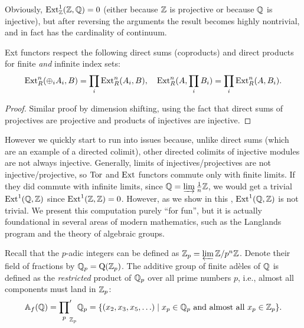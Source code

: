 Obviously, $\operatorname{Ext}^1_{\mathbb{Z}}(\mathbb{Z},\mathbb{Q})=0$ (either because $\mathbb{Z}$ is projective or because $\mathbb{Q}$ is injective), but after reversing the arguments the result becomes highly nontrivial, and in fact has the cardinality of continuum.

\begin{thm} Ext functors respect the following direct sums (coproducts) and direct products for finite \emph{and} infinite index sets:
    \[\operatorname{Ext}_R^n(\oplus_i A_i,B)=\prod_i\operatorname{Ext}_R^n(A_i,B),\quad \operatorname{Ext}_R^n(A,\prod_i B_i)=\prod_i \operatorname{Ext}_R^n(A,B_i).\]
\end{thm}
\begin{proof}
    Similar proof by dimension shifting, using the fact that direct sums of projectives are projective and products of injectives are injective.
\end{proof}

However we quickly start to run into issues because, unlike direct sums (which are an example of a directed colimit), other directed colimits of injective modules are not always injective. Generally, limits of injectives/projectives are not injective/projective, so $\operatorname{Tor}$ and $\operatorname{Ext}$ functors commute only with finite  limits. If they did commute with infinite limits, since $\mathbb{Q}=\varinjlim \frac{1}{n}\mathbb{Z}$, we would get a trivial $\operatorname{Ext}^1(\mathbb{Q},\mathbb{Z})$ since $\operatorname{Ext}^1(\mathbb{Z},\mathbb{Z})=0$. However, as we show in this \sect, $\operatorname{Ext}^1(\mathbb{Q},\mathbb{Z})$ is not trivial. We present this computation purely ``for fun'', but it is actually foundational in several areas of modern mathematics, such as the Langlands program and the theory of algebraic groups.

\begin{defn}
    Recall that the $p$-adic integers can be defined as $\mathbb{Z}_p=\varprojlim \mathbb{Z}\slash p^n\mathbb{Z}$. Denote their field of fractions by $\mathbb{Q}_p=\mathrm{Q}(\mathbb{Z}_p)$. The additive group of finite ad\`eles of $\mathbb{Q}$ is defined as the \emph{restricted} product of $\mathbb{Q}_p$ over all prime numbers $p$, i.e., almost all components must land in $\mathbb{Z}_p$:
    \[\mathbb{A}_f(\mathbb{Q})={\prod_{p}}^\prime_{\mathbb{Z}_p}\mathbb{Q}_p=\{(x_2,x_3,x_5,\ldots)\mid x_p\in\mathbb{Q}_p \text{ and almost all }x_p\in\mathbb{Z}_p \}.\]
\end{defn}

